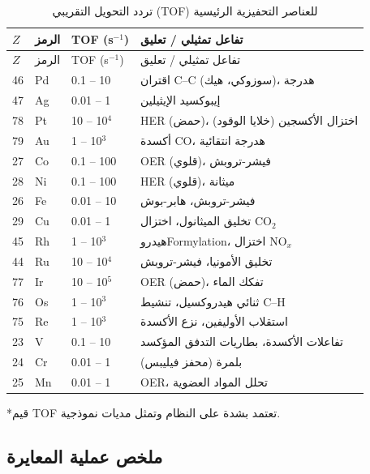 \documentclass[11pt,a4paper]{article}
\begin{document}
\begin{otherlanguage}{arabic}
		\begin{longtable}{p{1.2cm}p{1.2cm}p{3.0cm}p{6.5cm}}
			\caption{تردد التحويل التقريبي (TOF) للعناصر التحفيزية الرئيسية} \label{tab:tof-data} \\
			\toprule
			\(Z\) & الرمز & TOF (s\(^{-1}\)) & تفاعل تمثيلي / تعليق \\
			\midrule
			\endfirsthead
			\toprule
			\(Z\) & الرمز & TOF (s\(^{-1}\)) & تفاعل تمثيلي / تعليق \\
			\midrule
			\endhead
			46 & Pd & 0.1 – 10 & اقتران C–C (سوزوكي، هيك)، هدرجة \\
			47 & Ag & 0.01 – 1 & إيبوكسيد الإيثيلين \\
			78 & Pt & 10 – 10\(^4\) & HER (حمض)، اختزال الأكسجين (خلايا الوقود) \\
			79 & Au & 1 – 10\(^3\) & أكسدة CO، هدرجة انتقائية \\
			27 & Co & 0.1 – 100 & OER (قلوي)، فيشر-تروبش \\
			28 & Ni & 0.1 – 100 & HER (قلوي)، ميثانة \\
			26 & Fe & 0.01 – 10 & فيشر-تروبش، هابر-بوش \\
			29 & Cu & 0.01 – 1 & تخليق الميثانول، اختزال CO\(_2\) \\
			45 & Rh & 1 – 10\(^3\) & هيدروFormylation، اختزال NO\(_x\) \\
			44 & Ru & 10 – 10\(^4\) & تخليق الأمونيا، فيشر-تروبش \\
			77 & Ir & 10 – 10\(^5\) & OER (حمض)، تفكك الماء \\
			76 & Os & 1 – 10\(^3\) & ثنائي هيدروكسيل، تنشيط C–H \\
			75 & Re & 1 – 10\(^3\) & استقلاب الأوليفين، نزع الأكسدة \\
			23 & V  & 0.1 – 10 & تفاعلات الأكسدة، بطاريات التدفق المؤكسد \\
			24 & Cr & 0.01 – 1 & بلمرة (محفز فيليبس) \\
			25 & Mn & 0.01 – 1 & OER، تحلل المواد العضوية \\
			\bottomrule
		\end{longtable}
		*قيم TOF تعتمد بشدة على النظام وتمثل مديات نموذجية.
		
		\subsection{ملخص عملية المعايرة}
		

\end{otherlanguage}
\end{document}
